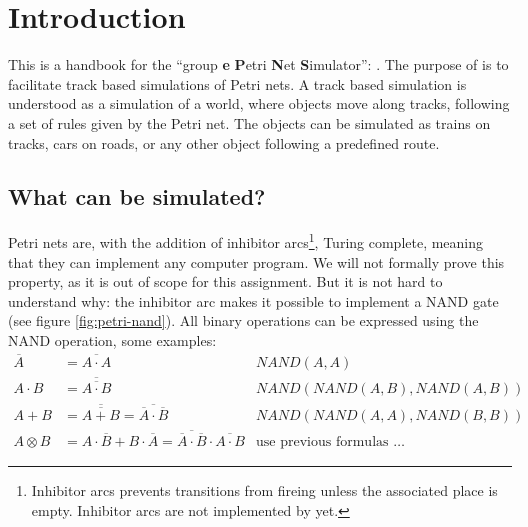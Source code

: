 \section{Introduction}
\label{sec:introduction}

This is a handbook for the ``group \textbf{e} \textbf{P}etri \textbf{N}et \textbf{S}imulator'': \epns.
The purpose of \epns{} is to facilitate track based simulations of Petri nets.
A track based simulation is understood as a simulation of a world, where objects move along tracks,
following a set of rules given by the Petri net. The objects can be simulated as trains on tracks, cars on roads,
or any other object following a predefined route.

\subsection{What can be simulated?}

Petri nets are, with the addition of inhibitor 
arcs\footnote{Inhibitor arcs prevents transitions from fireing unless the associated place is empty.
Inhibitor arcs are not implemented by \epns{} yet.},
Turing complete,
meaning that they can implement any computer program.
We will not formally prove this property, as it is out of scope for this
assignment.
But it is not hard to understand why: the inhibitor arc makes it possible to
implement a NAND gate (see figure \ref{fig:petri-nand}).
All binary operations can be expressed using the NAND operation, some examples:
\begin{align*}
    \overline{A} &= \overline{A \cdot A}               
	                & NAND(A, A) \\
    A \cdot B    &= \overline{\overline{A \cdot B}}
    				& NAND(NAND(A, B), NAND(A, B))\\
    A + B        &= \overline{\overline{A + B}} = \overline{\overline{A} \cdot \overline{B}} 
    				& NAND(NAND(A, A), NAND(B, B)) \\
    A \otimes B  &= A \cdot \overline{B} + B \cdot \overline{A}
    			  = \overline{\overline{A} \cdot \overline{B}} \cdot \overline{A \cdot B}
    				& \text{use previous formulas \ldots}
\end{align*}

